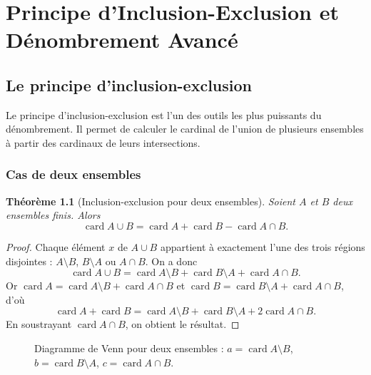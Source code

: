 \documentclass[12pt,a4paper,openany]{book}
\theoremstyle{definition}
\theoremstyle{plain}
\newtheorem{theoreme}[definition]{Théorème}
\theoremstyle{remark}
\DeclareMathOperator{\card}{card}
\begin{document}
\chapter{Principe d'Inclusion-Exclusion et Dénombrement Avancé}
\label{ch:inclusion-exclusion}

\section{Le principe d'inclusion-exclusion}
\label{sec:ie-principe}

Le principe d'inclusion-exclusion est l'un des outils
les plus puissants du dénombrement. Il permet de calculer le cardinal de l'union
de plusieurs ensembles à partir des cardinaux de leurs intersections.

\subsection{Cas de deux ensembles}

\begin{theoreme}[Inclusion-exclusion pour deux ensembles]
\label{thm:ie-deux}
Soient $A$ et $B$ deux ensembles finis. Alors
\[
  \card{A \cup B} = \card{A} + \card{B} - \card{A \cap B}.
\]
\end{theoreme}

\begin{proof}
Chaque élément $x$ de $A \cup B$ appartient à exactement l'une des trois
régions disjointes : $A \setminus B$, $B \setminus A$ ou $A \cap B$.
On a donc
\[
  \card{A \cup B} = \card{A \setminus B} + \card{B \setminus A} + \card{A \cap B}.
\]
Or $\card{A} = \card{A \setminus B} + \card{A \cap B}$ et
$\card{B} = \card{B \setminus A} + \card{A \cap B}$, d'où
\[
  \card{A} + \card{B} = \card{A \setminus B} + \card{B \setminus A} + 2\card{A \cap B}.
\]
En soustrayant $\card{A \cap B}$, on obtient le résultat.
\end{proof}

\begin{figure}[ht]
\centering
{}
\caption{Diagramme de Venn pour deux ensembles : $a = \card{A \setminus B}$,
$b = \card{B \setminus A}$, $c = \card{A \cap B}$.}
\label{fig:venn-deux}
\end{figure}
\end{document}
